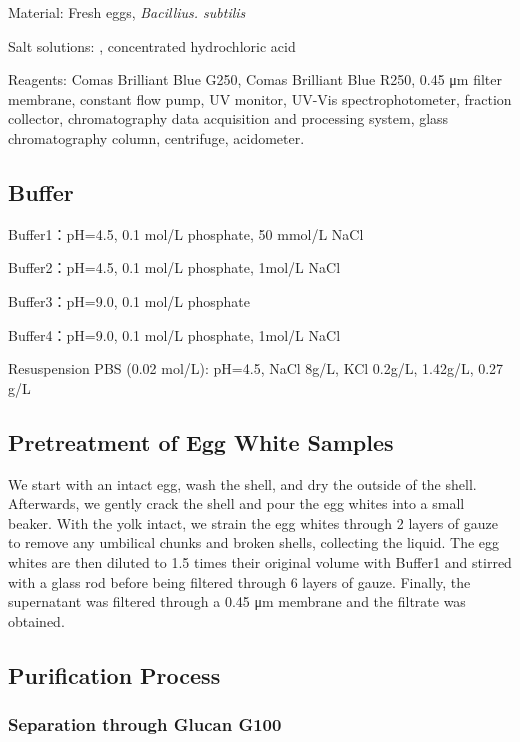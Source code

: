 Material: Fresh eggs, \emph{Bacillius. subtilis}

Salt solutions: , concentrated
hydrochloric acid

Reagents: Comas Brilliant Blue G250, Comas Brilliant Blue R250, 0.45 μm
filter membrane, 
constant flow pump, UV monitor, UV-­Vis spectrophotometer, fraction
collector, chromatography data acquisition and processing system, glass chromatography column, centrifuge, acidometer.

\hypertarget{header-n9}{%
\subsection{Buffer}\label{header-n9}}

Buffer1：pH=4.5, 0.1 mol/L phosphate, 50 mmol/L NaCl

Buffer2：pH=4.5, 0.1 mol/L phosphate, 1mol/L NaCl

Buffer3：pH=9.0, 0.1 mol/L phosphate

Buffer4：pH=9.0, 0.1 mol/L phosphate, 1mol/L NaCl

Resuspension PBS (0.02 mol/L): pH=4.5, NaCl 8g/L, KCl 0.2g/L,  1.42g/L,  0.27 g/L

\hypertarget{header-n13}{%
\subsection{Pretreatment of Egg White Samples}\label{header-n13}}

We start with an intact egg, wash the shell, and dry the outside of the
shell. Afterwards, we gently crack the shell and pour the egg whites
into a small beaker. With the yolk intact, we strain the egg whites
through 2 layers of gauze to remove any umbilical chunks and broken
shells, collecting the liquid. The egg whites are then diluted to 1.5
times their original volume with Buffer1 and stirred with a glass rod
before being filtered through 6 layers of gauze. Finally, the
supernatant was filtered through a 0.45 μm membrane and the filtrate was
obtained.

\hypertarget{header-n15}{%
\subsection{Purification Process}\label{header-n15}}

\hypertarget{header-n16}{%
\subsubsection{Separation through Glucan G100}\label{header-n16}}

